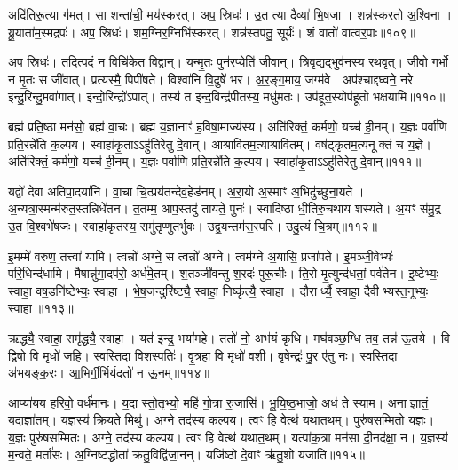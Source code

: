 अदि॑तिरू॒त्या ग॑मत्।
सा शन्ता॑ची॒ मय॑स्करत्।
अप॒ स्रिधः॑।
उ॒त त्या दैव्या॑ भि॒षजा।
शन्न॑स्करतो अ॒श्विना।
यू॒याता॑म॒स्मद्रपः॑।
अप॒ स्रिधः॑।
शम॒ग्निर॒ग्निभि॑स्करत्।
शन्न॑स्तपतु॒ सूर्यः॑।
शं वातो॑ वात्वर॒पाः॥१०९॥

अप॒ स्रिधः॑।
तदित्प॒दं न विचि॑केत वि॒द्वान्।
यन्मृ॒तः पुन॑र॒प्येति॑ जी॒वान्।
त्रि॒वृद्यद्भुव॑नस्य रथ॒वृत्।
जी॒वो गर्भो॒ न मृ॒तः स जी॑वात्।
प्रत्य॑स्मै॒ पिपी॑षते।
विश्वा॑नि वि॒दुषे॑ भर।
अ॒र॒ङ्ग॒माय॒ जग्म॑वे।
अप॑श्चाद्दघ्वने॒ नरे।
इन्दु॒रिन्दु॒मवा॑गात्।
इन्दो॒रिन्द्रो॑\-ऽपात्।
तस्य॑ त इन्द॒विन्द्र॑पीतस्य॒ मधु॑मतः।
उप॑हूत॒स्योप॑हूतो भक्षयामि॥११०॥\anuvakamend[उ॒द॒र्॒ष इ॑न्द्रि॒येण॒ गा म॒तिर॑र॒पा अ॑गा॒त्रीणि॑ च]

ब्रह्म॑ प्रति॒ष्ठा मन॑सो॒ ब्रह्म॑ वा॒चः।
ब्रह्म॑ य॒ज्ञानाꣳ॑ ह॒विषा॒माज्य॑स्य।
अति॑रिक्तं॒ कर्म॑णो॒ यच्च॑ ही॒नम्।
य॒ज्ञः पर्वा॑णि प्रति॒रन्ने॑ति क॒ल्पय\sn{}।
स्वाहा॑कृ॒ता\-ऽऽहु॑तिरेतु दे॒वान्।
आश्रा॑वितम॒त्याश्रा॑वितम्।
वष॑ट्कृतम॒त्यनूक्तं च य॒ज्ञे।
अति॑रिक्तं॒ कर्म॑णो॒ यच्च॑ ही॒नम्।
य॒ज्ञः पर्वा॑णि प्रति॒रन्ने॑ति क॒ल्पय\sn{}।
स्वाहा॑कृ॒ता\-ऽऽहु॑तिरेतु दे॒वान्॥१११॥

यद्वो॑ देवा अतिपा॒दया॑नि।
वा॒चा चि॒त्प्रय॑तन्देव॒हेड॑नम्।
अ॒रा॒यो अ॒स्माꣳ अ॒भिदु॑च्छुना॒यते।
अ॒न्यत्रा॒स्मन्म॑रुत॒स्तन्निधे॑तन।
त॒तम्म॒ आप॒स्तदु॑ तायते॒ पुनः॑।
स्वादि॑ष्ठा धी॒तिरु॒चथा॑य शस्यते।
अ॒यꣳ स॑मु॒द्र उ॒त वि॒श्वभे॑षजः।
स्वाहा॑कृतस्य॒ समु॑तृप्णुतर्भुवः।
उद्व॒यन्तम॑स॒स्परि॑।
उदु॒त्यं चि॒त्रम्॥११२॥

इ॒मम्मे॑ वरुण॒ तत्त्वा॑ यामि।
त्वन्नो॑ अग्ने॒ स त्वन्नो॑ अग्ने।
त्वम॑ग्ने अ॒यासि॒ प्रजा॑पते।
इ॒मञ्जी॒वेभ्यः॑ परि॒धिन्द॑धामि।
मैषान्नु॑गा॒दप॑रो॒ अर्ध॑मे॒तम्।
श॒तञ्जी॑वन्तु श॒रदः॑ पुरू॒चीः।
ति॒रो मृ॒त्युन्द॑धतां॒ पर्व॑तेन।
इ॒ष्टेभ्यः॒ स्वाहा॒ वष॒डनि॑ष्टेभ्यः॒ स्वाहा।
भे॒ष॒जन्दुरि॑ष्ट्यै॒ स्वाहा॒ निष्कृ॑त्यै॒ स्वाहा।
दौरार्ध्यै॒ स्वाहा॒ दैवीभ्यस्त॒नूभ्यः॒ स्वाहा॥११३॥

ऋद्ध्यै॒ स्वाहा॒ समृ॑द्ध्यै॒ स्वाहा।
यत॑ इन्द्र॒ भया॑महे।
ततो॑ नो॒ अभ॑यं कृधि।
मघ॑वञ्छ॒ग्धि तव॒ तन्न॑ ऊ॒तये।
वि द्विषो॒ वि मृधो॑ जहि।
स्व॒स्ति॒दा वि॒शस्पतिः॑।
वृ॒त्र॒हा वि मृधो॑ व॒शी।
वृषेन्द्रः॑ पु॒र ए॑तु नः।
स्व॒स्ति॒दा अ॑भयङ्क॒रः।
आ॒भिर्गी॒र्भिर्यदतो॑ न ऊ॒नम्॥११४॥

आप्या॑यय हरिवो॒ वर्ध॑मानः।
य॒दा स्तो॒तृभ्यो॒ महि॑ गो॒त्रा रु॒जासि॑।
भू॒यि॒ष्ठ॒भाजो॒ अध॑ ते स्याम।
अनाज्ञातं॒ यदाज्ञा॑तम्।
य॒ज्ञस्य॑ क्रि॒यते॒ मिथु॑।
अग्ने॒ तद॑स्य कल्पय।
त्वꣳ हि वेत्थ॑ यथात॒थम्।
पुरु॑षसम्मितो य॒ज्ञः।
य॒ज्ञः पुरु॑षसम्मितः।
अग्ने॒ तद॑स्य कल्पय।
त्वꣳ हि वेत्थ॑ यथात॒थम्।
यत्पा॑क॒त्रा मन॑सा दी॒नद॑क्षा॒ न।
य॒ज्ञस्य॑ म॒न्वते॒ मर्ता॑सः।
अ॒ग्निष्टद्धोता॑ क्रतु॒विद्वि॑जा॒नन्।
यजि॑ष्ठो दे॒वाꣳ ऋ॑तु॒शो य॑जाति॥११५॥\anuvakamend[दे॒वाꣳ श्चि॒त्रं त॒नूभ्यः॒ स्वाहो॒नं पुरु॑षसम्मि॒तो\-ऽग्ने॒ तद॑स्य कल्पय॒ पञ्च॑ च]

